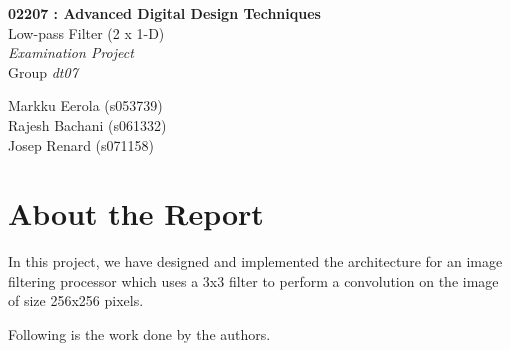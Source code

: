 \documentclass[11pt,a4paper]{article}
\begin{document}
	

\begin{titlepage}

\thispagestyle{fancy}
\lhead{}
\rhead{}
\rule{0pt}{50pt}
\vspace{3cm}

\begin{center}
 	\huge{\textbf{02207 : Advanced Digital Design Techniques}}\\
 	\vspace{1cm}
 	\huge{Low-pass Filter (2 x 1-D)}\\
 	\vspace{1cm}
 	\huge{\textit{Examination Project}}\\
 	\vspace{1cm}
 	\huge{Group \textit{dt07}}\\
\end{center}

\vspace{4cm}

\begin{flushright}
	\LARGE{Markku Eerola (s053739)}\\
	\vspace{0.3cm}
	\LARGE{Rajesh Bachani (s061332)}\\
	\vspace{0.3cm}
	\LARGE{Josep Renard (s071158)}\\
\end{flushright}
\cfoot{\today}
\end{titlepage}

\newpage 
\tableofcontents

\newpage

\section{About the Report}
In this project, we have designed and implemented the architecture for an image filtering processor which uses a 3x3 filter to perform a convolution on the image of size 256x256 pixels.

Following is the work done by the authors.
\end{document}
